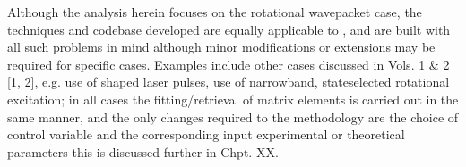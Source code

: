 \documentclass[letterpaper,table,10pt,english]{jupyterBook}
\begin{document}
\sphinxAtStartPar
Although the analysis herein focuses on the rotational wavepacket case, the techniques and codebase developed are equally applicable to , and are built with all such problems in mind \sphinxhyphen{} although minor modifications or extensions may be required for specific cases. Examples include other cases discussed in  Vols. 1 \& 2 {[}\hyperlink{cite.backmatter/bibliography:id569}{1}, \hyperlink{cite.backmatter/bibliography:id570}{2}{]}, e.g. use of shaped laser pulses, use of narrow\sphinxhyphen{}band, state\sphinxhyphen{}selected rotational excitation; in all cases the fitting/retrieval of matrix elements is carried out in the same manner, and the only changes required to the methodology are the choice of control variable and the corresponding input experimental or theoretical parameters \sphinxhyphen{} this is discussed further in Chpt. XX.
\end{document}
